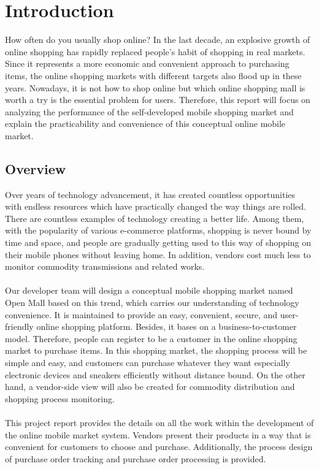 \documentclass{article}
\begin{document}
\tableofcontents

\clearpage
\listoflistings


\section{Introduction}

How often do you usually shop online? In the last decade, an explosive growth of online shopping has rapidly replaced people’s habit of shopping in real markets. Since it represents a more economic and convenient approach to purchasing items, the online shopping markets with different targets also flood up in these years\cite{1}. Nowadays, it is not how to shop online but which online shopping mall is worth a try is the essential problem for users. Therefore, this report will focus on analyzing the performance of the self-developed mobile shopping market and explain the practicability and convenience of this conceptual online mobile market.
\subsection{Overview}

Over years of technology advancement, it has created countless opportunities with endless resources which have practically changed the way things are rolled. There are countless examples of technology creating a better life. Among them, with the popularity of various e-commerce platforms, shopping is never bound by time and space, and people are gradually getting used to this way of shopping on their mobile phones without leaving home. In addition, vendors cost much less to monitor commodity transmissions and related works. 
\\\\
Our developer team will design a conceptual mobile shopping market named Open Mall based on this trend, which carries our understanding of technology convenience. It is maintained to provide an easy, convenient, secure, and user-friendly online shopping platform. Besides, it bases on a business-to-customer model. Therefore, people can register to be a customer in the online shopping market to purchase items\cite{2}. 
In this shopping market, the shopping process will be simple and easy, and customers can purchase whatever they want especially electronic devices and sneakers efficiently without distance bound. On the other hand, a vendor-side view will also be created for commodity distribution and shopping process monitoring.
\\\\
This project report provides the details on all the work within the development of the online mobile market system. Vendors present their products in a way that is convenient for customers to choose and purchase. Additionally, the process design of purchase order tracking and purchase order processing is provided.
\end{document}
